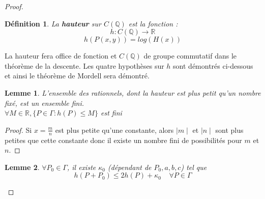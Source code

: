 \documentclass[a4paper]{article}
\newtheorem{definition}{Définition}
\newtheorem{lem}{Lemme}
\begin{document}
\begin{proof}
\begin{definition}
La \textbf{hauteur} sur $C(\mathbb{Q})$ est la fonction : 
\begin{equation*}
h : C(\mathbb{Q}) \rightarrow \mathbb{R} 
\end{equation*}
\begin{equation*}
h(P(x,y))=log(H(x))
\end{equation*}
\end{definition} 
La hauteur fera office de fonction et $C(\mathbb{Q})$ de groupe commutatif dans le théorème de la descente.
Les quatre hypothèses sur $h$ sont démontrés ci-dessous et ainsi le théorème de Mordell sera démontré.

\begin{lem}
L'ensemble des rationnels, dont la hauteur est plus petit qu'un nombre fixé, est un ensemble fini. \\
$\forall M \in \mathbb{R}, \{P \in \Gamma : h(P) \leqslant M\}$ est fini
\end{lem}

\begin{proof}
Si $x=\frac{m}{n}$ est plus petite qu'une constante, alors $\mid m \mid$ et $\mid n \mid$ sont plus petites que cette constante donc il existe un nombre fini de possibilités pour $m$ et $n$.
\end{proof}

\begin{lem}
$\forall P_{0} \in \Gamma$, il existe $\kappa_{0}$ (dépendant de $P_{0},a,b,c$) tel que 
\begin{equation}
h(P+P_{0}) \leqslant 2h(P) + \kappa_{0} \; \; \; \; \forall P \in \Gamma   
\end{equation}
\end{lem}



\end{proof}
\end{document}
